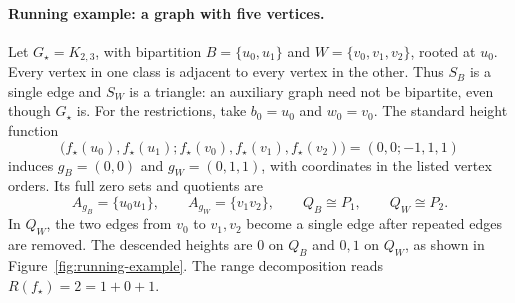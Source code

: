 \documentclass[11pt,reqno]{amsart}
\theoremstyle{remark}
\numberwithin{equation}{section}
\begin{document}
\paragraph{Running example: a graph with five vertices.}
Let $G_\star=K_{2,3}$, with bipartition
$B=\{u_0,u_1\}$ and $W=\{v_0,v_1,v_2\}$, rooted at $u_0$.
Every vertex in one class is adjacent to every vertex in the other.
Thus $S_B$ is a single edge and $S_W$ is a triangle: an auxiliary
graph need not be bipartite, even though $G_\star$ is.
For the restrictions, take $b_0=u_0$ and $w_0=v_0$.
The standard height function
\[
 \bigl(f_\star(u_0),f_\star(u_1);
       f_\star(v_0),f_\star(v_1),f_\star(v_2)\bigr)
       =(0,0;-1,1,1)
\]
induces $g_B=(0,0)$ and $g_W=(0,1,1)$, with coordinates in the
listed vertex orders. Its full zero sets and quotients are
\[
 A_{g_B}=\{u_0u_1\},\qquad A_{g_W}=\{v_1v_2\},\qquad
 Q_B\cong P_1,\qquad Q_W\cong P_2.
\]
In $Q_W$, the two edges from $v_0$ to $v_1,v_2$ become a single edge
after repeated edges are removed. The descended heights are $0$ on
$Q_B$ and $0,1$ on $Q_W$, as shown in
Figure~\ref{fig:running-example}. The range decomposition reads
$R(f_\star)=2=1+0+1$.
\end{document}
